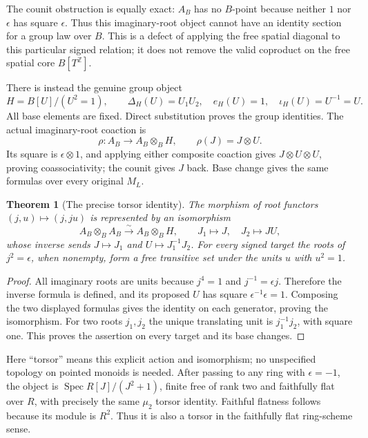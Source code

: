 \documentclass[11pt,a4paper]{article}
\newtheorem{theorem}{Theorem}[section]
\theoremstyle{definition}\newtheorem{definition}[theorem]{Definition}
\newcommand{\Z}{\mathbb Z}\newcommand{\Q}{\mathbb Q}
\begin{document}
The counit obstruction is equally exact: $A_B$ has no $B$-point
because neither $1$ nor $\epsilon$ has square $\epsilon$.
Thus this imaginary-root object cannot have an identity section
for a group law over $B$. This is a defect of applying the free
spatial diagonal to this particular signed relation; it does not
remove the valid coproduct on the free spatial core $B[T^{\Z}]$.

There is instead the genuine group object
\[
 H=B[U]/(U^2=1),\qquad
 \Delta_H(U)=U_1U_2,\quad e_H(U)=1,\quad\iota_H(U)=U^{-1}=U.
 \tag{AT11}\label{at:eq:mu-two}
\]
All base elements are fixed. Direct substitution proves the
group identities. The actual imaginary-root coaction is
\[
 \rho:A_B\longrightarrow A_B\otimes_BH,
 \qquad \rho(J)=J\otimes U.
 \tag{AT12}\label{at:eq:coaction}
\]
Its square is $\epsilon\otimes1$, and applying either composite
coaction gives $J\otimes U\otimes U$, proving coassociativity;
the counit gives $J$ back. Base change gives the same formulas
over every original $M_L$.

\begin{theorem}[The precise torsor identity]
\label{at:thm:torsor}
The morphism of root functors
$(j,u)\mapsto(j,ju)$ is represented by an isomorphism
\[
 A_B\otimes_BA_B\xrightarrow{\sim}A_B\otimes_BH,
 \qquad J_1\mapsto J,\quad J_2\mapsto JU,
 \tag{AT13}\label{at:eq:torsor-identity}
\]
whose inverse sends $J\mapsto J_1$ and
$U\mapsto J_1^{-1}J_2$. For every signed target the roots of
$j^2=\epsilon$, when nonempty, form a free transitive set under
the units $u$ with $u^2=1$.
\end{theorem}
\begin{proof}
All imaginary roots are units because $j^4=1$ and
$j^{-1}=\epsilon j$. Therefore the inverse formula is defined,
and its proposed $U$ has square $\epsilon^{-1}\epsilon=1$.
Composing the two displayed formulas gives the identity on each
generator, proving the isomorphism. For two roots $j_1,j_2$ the
unique translating unit is $j_1^{-1}j_2$, with square one.
This proves the assertion on every target and its base changes.
\end{proof}

Here ``torsor'' means this explicit action and isomorphism;
no unspecified topology on pointed monoids is needed. After
passing to any ring with $\epsilon=-1$, the object is
$\operatorname{Spec}R[J]/(J^2+1)$, finite free of rank two and
faithfully flat over $R$, with precisely the same $\mu_2$ torsor
identity. Faithful flatness follows because its module is $R^2$.
Thus it is also a torsor in the faithfully flat ring-scheme sense.
\end{document}
